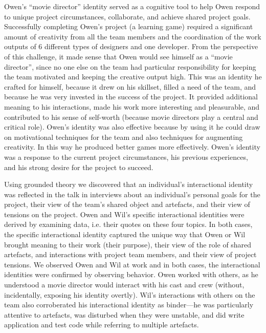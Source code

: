 \documentclass{chi2009}
\begin{document}
Owen's ``movie director'' identity served as a cognitive tool to help Owen respond to unique project circumstances, collaborate, and achieve shared project goals. Successfully completing Owen's project (a learning game) required a significant amount of creativity from all the team members and the  coordination of the work outputs of 6 different types of designers and one developer.  From the perspective of this challenge, it made sense that Owen would see himself as a ``movie director'', since no one else on the team had particular responsibility for keeping the team motivated and keeping the creative output high.  This was an identity he crafted for himself, because it drew on his skillset, filled a need of the team, and because he was very invested in the success of the project.  It provided additional meaning to his interactions, made his work more interesting and pleasurable, and contributed to his sense of self-worth (because movie directors play a central and critical role).  Owen's identity was also effective because by using it he could draw on motivational techniques for the team and also techniques for augmenting creativity.  In this way he produced better games more effectively.   Owen's identity was a response to the current project circumstances, his previous experiences, and his strong desire for the project to succeed.  

\bigskip

Using grounded theory we discovered that an individual's interactional identity was reflected in the talk in interviews about an individual's personal goals for the project, their view of the team's shared object and artefacts, and their view of tensions on the project. Owen and Wil's specific interactional identities were derived by examining data, i.e. their quotes on these four topics. In both cases, the specific interactional identity captured the unique way that Owen or Wil brought meaning to their work (their purpose), their view of the role of shared artefacts, and interactions with project team members, and their view of project tensions. We observed Owen and Wil at work and in both cases, the interactional identities were confirmed by observing behavior.  Owen worked with others, as he understood a movie director would interact with his cast and crew (without, incidentally, exposing his identity overtly).  Wil's interactions with others on the team also corroberated his interactional identity as binder---he was particularly attentive to artefacts, was disturbed when they were unstable, and did write application and test code while referring to multiple artefacts.  
\end{document}

